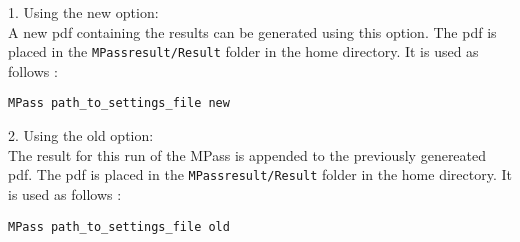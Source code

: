 \documentclass[a4paper]{article}
\begin{document}
1. Using the new option:\\

A new pdf containing the results can be generated using this option. The pdf is placed
in the {\tt MPass\textunderscore result/Result} folder in the home directory. It is used as follows :

\begin{Verbatim}
MPass path_to_settings_file new
\end{Verbatim}
2. Using the old option:
\\
The result for this run of the MPass is appended to the previously genereated pdf. 
The pdf is placed in the {\tt MPass\textunderscore result/Result} folder in the home directory. 
It is used as follows :

\begin{Verbatim}
MPass path_to_settings_file old
\end{Verbatim}


\pagebreak





{}



\pagebreak
{}
{}

\end{document}

